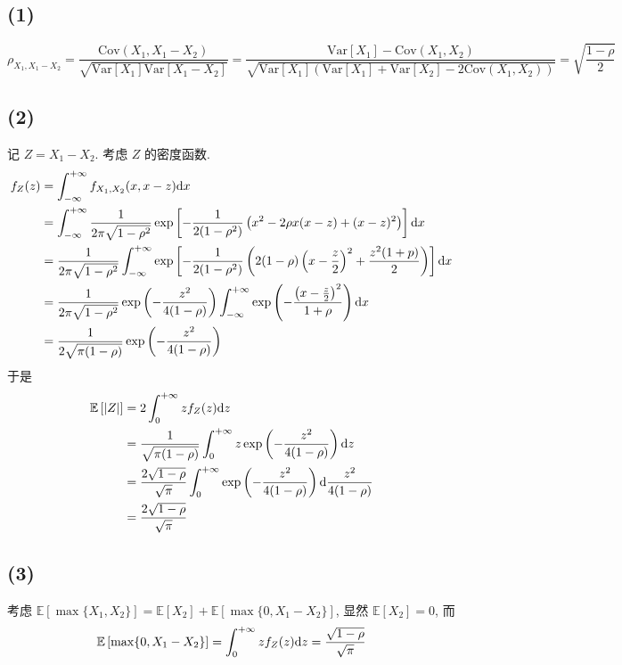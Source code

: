 \documentclass[8pt]{article}
\theoremstyle{compact}
\def\E#1{\mathbb{E}\left[{#1}\right]}
\def\Var#1{\text{Var}\left[{#1}\right]}
\def\Cov#1{\text{Cov}\left({#1}\right)}
\begin{document}
\subsection*{(1)}
\begin{equation*}
	\rho_{X_1, X_1 - X_2} = \frac{\Cov{X_1, X_1 - X_2}}{\sqrt{\Var{X_1}\Var{X_1 - X_2}}} = \frac{\Var{X_1} - \Cov{X_1, X_2}}{\sqrt{\Var{X_1} (\Var{X_1} + \Var{X_2} - 2\Cov{X_1, X_2}) }} = \sqrt{\frac{1-\rho}{2}}
\end{equation*}
\subsection*{(2)}
记 $Z = X_1 - X_2$. 考虑 $Z$ 的密度函数.
\begin{equation*}
	\begin{split}
		f_Z(z) &= \int_{-\infty}^{+\infty}f_{X_1, X_2}(x, x - z)\text dx\\
		&= \int_{-\infty}^{+\infty}\frac{1}{2\pi\sqrt{1-\rho^2}}\exp\left[-\frac{1}{2(1-\rho^2)}\left(x^2 - 2\rho x(x-z) + (x-z)^2\right)\right] \text dx\\
		&= \frac{1}{2\pi\sqrt{1-\rho^2}}\int_{-\infty}^{+\infty}\exp\left[-\frac{1}{2(1-\rho^2)}\left(2(1-\rho)\left(x - \frac z2\right)^2 + \frac{z^2(1+p)}{2}\right)\right] \text dx\\
		&= \frac{1}{2\pi\sqrt{1-\rho^2}}\exp\left(-\frac{z^2}{4(1-\rho)}\right)\int_{-\infty}^{+\infty}\exp\left(-\frac{\left(x - \frac z2\right)^2}{1+\rho}\right)\text dx\\
		&= \frac{1}{2\sqrt{\pi(1 - \rho)}}\exp\left(-\frac{z^2}{4(1-\rho)}\right)
	\end{split}
\end{equation*}
于是
\begin{equation*}
	\begin{split}
		\E{|Z|} &= 2\int_{0}^{+\infty} zf_Z(z)\text dz\\
		&= \frac{1}{\sqrt{\pi(1 - \rho)}}\int_{0}^{+\infty} z\exp\left(-\frac{z^2}{4(1-\rho)}\right)\text dz\\
		&= \frac{2\sqrt{1-\rho}}{\sqrt{\pi}}\int_0^{+\infty}\exp\left(-\frac{z^2}{4(1-\rho)}\right)\text d\frac{z^2}{4(1-\rho)}\\
		&= \frac{2\sqrt{1-\rho}}{\sqrt \pi}
	\end{split}
\end{equation*}

\subsection*{(3)}
考虑 $\E{\max\{X_1, X_2\}} = \E{X_2} + \E{\max\{0, X_1 - X_2\}}$, 显然 $\E{X_2} = 0$, 而\begin{equation*}
	\E{\max\{0, X_1 - X_2\}} = \int_{0}^{+\infty}zf_Z(z)\text dz = \frac{\sqrt{1 - \rho}}{\sqrt{\pi}}
\end{equation*}
\end{document}
